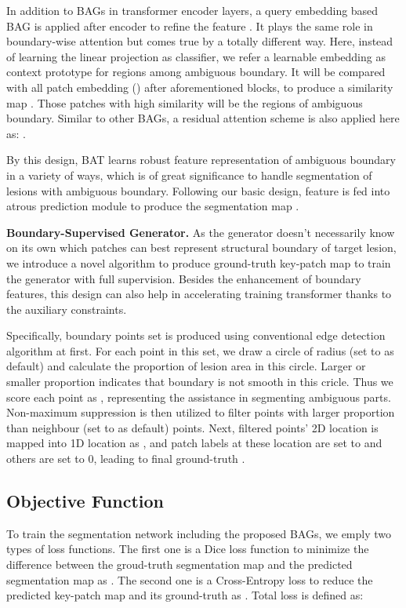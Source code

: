 \documentclass[runningheads]{paper478-llncs}
\begin{document}
In addition to BAGs in transformer encoder layers, a query embedding based BAG is applied after encoder to refine the feature . It plays the same role in boundary-wise attention but comes true by a totally different way.
Here, instead of learning the linear projection as classifier, we refer a learnable embedding  as context prototype for regions among ambiguous boundary. It will be compared with all patch embedding () after aforementioned blocks, to produce a similarity map . Those patches with high similarity will be the regions of ambiguous boundary. Similar to other BAGs, a residual attention scheme is also applied here as: . 

By this design, BAT learns robust feature representation of ambiguous boundary in a variety of ways, which is of great significance to handle segmentation of lesions with ambiguous boundary. 
Following our basic design, feature  is fed into atrous prediction module to produce the segmentation map .

\textbf{Boundary-Supervised Generator.} 
As the generator doesn't necessarily know on its own which patches can best represent structural boundary of target lesion, we introduce a novel algorithm to produce ground-truth key-patch map to train the generator with full supervision.
Besides the enhancement of boundary features, this design can also help in accelerating training transformer thanks to the auxiliary constraints.

Specifically, boundary points set is produced using conventional edge detection algorithm at first. 
For each point in this set, we draw a circle of radius  (set to  as default) and calculate the proportion  of lesion area in this circle.
Larger or smaller proportion indicates that boundary is not smooth in this cricle.
Thus we score each point as , representing the assistance in segmenting ambiguous parts.
Non-maximum suppression is then utilized to filter points with larger proportion than neighbour  (set to  as default) points.
Next, filtered points' 2D location  is mapped into 1D location as , and patch labels at these location are set to  and others are set to 0, leading to final ground-truth . 


\subsection{Objective Function}
\label{section_objective_function}
To train the segmentation network including the proposed BAGs, we emply two types of loss functions. The first one is a Dice loss function to minimize the difference between the groud-truth segmentation map and the predicted segmentation map as . The second one is a Cross-Entropy loss to reduce the predicted key-patch map and its ground-truth as . Total loss is defined as:
\end{document}
